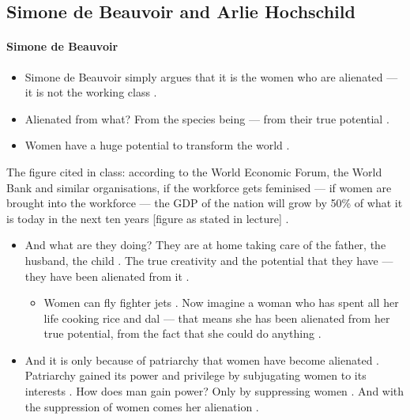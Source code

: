 \subsection{Simone de Beauvoir and Arlie Hochschild}

\paragraph{Simone de Beauvoir}
\begin{itemize}
    \item Simone de Beauvoir simply argues that it is the women who are alienated --- it is not the working class .
    \item Alienated from what? From the species being --- from their true potential .
    \item Women have a huge potential to transform the world .
\end{itemize}

\begin{DataFact}
The figure cited in class: according to the World Economic Forum, the World Bank and similar organisations, if the workforce gets feminised --- if women are brought into the workforce --- the GDP of the nation will grow by 50\% of what it is today in the next ten years [figure as stated in lecture] .
\end{DataFact}

\begin{itemize}
    \item And what are they doing? They are at home taking care of the father, the husband, the child . The true creativity and the potential that they have --- they have been alienated from it .
    \begin{itemize}
        \item Women can fly fighter jets . Now imagine a woman who has spent all her life cooking rice and dal --- that means she has been alienated from her true potential, from the fact that she could do anything .
    \end{itemize}
    \item And it is only because of patriarchy that women have become alienated . Patriarchy gained its power and privilege by subjugating women to its interests . How does man gain power? Only by suppressing women . And with the suppression of women comes her alienation .
\end{itemize}

